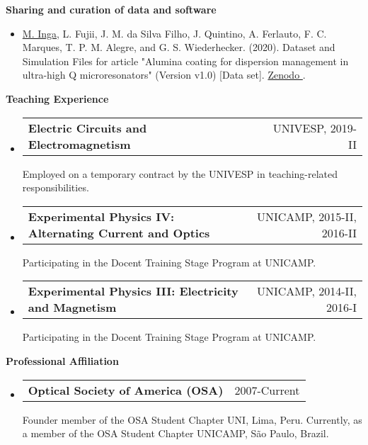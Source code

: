 \documentclass[letterpaper, 12pt]{article}[leftmargin=*]
\makeatletter
\renewcommand{\section}[2]{
  \colorbox{secondary}{\color{white}\raggedbottom\normalsize\textbf{{#1}{\hspace{7pt}#2}}}
}
\newcommand{\resumeEntryStart}{\begin{itemize}[leftmargin=2.5mm]\itemsep8pt}
\newcommand{\resumeEntryEnd}{\end{itemize}}
\newcommand{\resumeItemListStart}{\begin{itemize}[leftmargin=4.5mm]\itemsep-3pt}
\newcommand{\resumeItemListEnd}{\end{itemize}}
\newcommand{\resumeItem}[1]{
  \item\small{
    {#1}
  }
}
\newcommand{\resumeEntryTD}[2]{
  \item[]
    \begin{tabularx}{0.97\textwidth}{X@{\hspace{60pt}}r}
      \textbf{\color{primary}#1} & {\firabook\color{accent}\small#2}
    \end{tabularx}\vspace{2pt}
}
\makeatother
\begin{document}
\textbf{Sharing and curation of data and software}
\vspace{-3pt}
\resumeItemListStart
\resumeItem {\underline{M. Inga}, L. Fujii, J. M. da Silva Filho, J. Quintino, A. Ferlauto, F. C. Marques, T. P. M. Alegre, and G. S. Wiederhecker. (2020). Dataset and Simulation Files for article "Alumina coating for dispersion management in ultra-high Q microresonators" (Version v1.0) [Data set]. \href{https://zenodo.org/record/3932243}{Zenodo \faExternalLink}.}
\resumeItemListEnd

\section{\faPencil}{Teaching Experience}
\resumeEntryStart
\resumeEntryTD
{Electric Circuits and Electromagnetism}{UNIVESP, 2019-II\vspace{-0.2cm}} 
{\footnotesize Employed on a temporary contract by the UNIVESP in teaching-related responsibilities.}
\vspace{-0.3cm}
\resumeEntryTD
{Experimental Physics IV: Alternating Current and Optics}{UNICAMP, 2015-II, 2016-II\vspace{-0.2cm}}
{\footnotesize Participating in the Docent Training Stage Program at UNICAMP.}
\vspace{-0.3cm}
\resumeEntryTD
{Experimental Physics III: Electricity and Magnetism}{UNICAMP, 2014-II, 2016-I\vspace{-0.2cm}}
{\footnotesize Participating in the Docent Training Stage Program at UNICAMP.}
\resumeEntryEnd

\section{\faGroup}{Professional Affiliation}
\resumeEntryStart
\resumeEntryTD
{\small Optical Society of America (OSA)}{2007-Current}
{\footnotesize Founder member of the OSA Student Chapter UNI, Lima, Peru. Currently, as a member of the OSA Student Chapter UNICAMP, São Paulo, Brazil.}
\resumeEntryEnd

\end{document}
